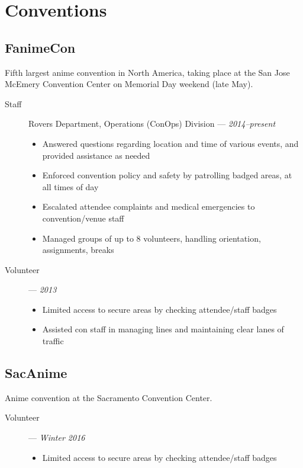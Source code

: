 \documentclass[10pt]{article}
\author{August Valera}
\begin{document}

\section*{Conventions}

\subsection*{FanimeCon}
Fifth largest anime convention in North America, taking place at the San Jose
McEmery Convention Center on Memorial Day weekend (late May).

\begin{description}
  \item[Staff] Rovers Department, Operations (ConOps) Division ---
    \textit{2014--present}
    \begin{itemize}
      \item Answered questions regarding location and time of various events,
        and provided assistance as needed
      \item Enforced convention policy and safety by patrolling
        badged areas, at all times of day
      \item Escalated attendee complaints and medical emergencies to
        convention/venue staff
      \item Managed groups of up to $8$ volunteers, handling orientation,
        assignments, breaks
    \end{itemize}
  \item[Volunteer] --- \textit{2013}
    \begin{itemize}
      \item Limited access to secure areas by checking attendee/staff badges
      \item Assisted con staff in managing lines and maintaining clear lanes of
        traffic
    \end{itemize}
\end{description}

\subsection*{SacAnime}
Anime convention at the Sacramento Convention Center.

\begin{description}
  \item[Volunteer] --- \textit{Winter 2016}
    \begin{itemize}
      \item Limited access to secure areas by checking attendee/staff badges
    \end{itemize}
\end{description}
\end{document}
